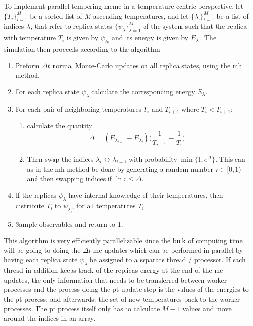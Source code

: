 To implement parallel tempering \ac{mcmc} in a temperature centric perspective,
let $\{T_i\}_{i=1}^M$ be a sorted list of $M$ ascending temperatures, and let $\{\lambda_i\}_{i=1}^M$
be a list of indices $\lambda$, that refer to replica states $\{\psi_\lambda\}_{\lambda=1}^M$ of the system such that the replica with temperature $T_i$
is given by $\psi_{\lambda_i}$ and its energy is given by $E_{\lambda_i}$.
The simulation then proceeds according to the algorithm
\begin{enumerate}
    \item Preform $\Delta t$ normal Monte-Carlo updates on all replica states, \eg using the \ac{mh} method.
    \item For each replica state $\psi_\lambda$ calculate the corresponding energy $E_\lambda$.
    \item For each pair of neighboring temperatures $T_i$ and $T_{i+1}$ where $T_i<T_{i+1}$:
        \begin{enumerate}
            \item calculate the quantity
            \begin{equation}
                \label{eq:Monte:PT:delta}
                \Delta = (E_{\lambda_{i+1}} - E_{\lambda_i})\Big(\frac{1}{T_{i+1}} - \frac{1}{T_i}\Big).
            \end{equation}
            \item Then swap the indices $\lambda_i \leftrightarrow \lambda_{i+1}$ with probability $\min\{1, e^\Delta\}$. This can
                as in the \ac{mh} method be done by generating a random number $r\in[0,1)$ and then swapping indices if
                $\ln r \leq \Delta$.
        \end{enumerate}
    \item If the replicas $\psi_\lambda$ have internal knowledge of their temperatures, then distribute $T_i$ to $\psi_{\lambda_i}$, for all
        temperatures $T_i$.
    \item Sample observables and return to 1.
\end{enumerate}

This algorithm is very efficiently parallelizable since the bulk of computing time will be going to doing the $\Delta t$ \ac{mc} updates which can
be performed in parallel by having each replica state $\psi_\lambda$ be assigned to a separate thread / processor. If each thread in addition
keeps track of the replicas energy at the end of the \ac{mc} updates, the only information that needs to be transferred between worker processes and
the process doing the \ac{pt} update step is the values of the energies to the \ac{pt} process, and afterwards: the set of new temperatures
back to the worker processes. The \ac{pt} process itself only has to 
calculate $M-1$ values and move around the indices in an array.

